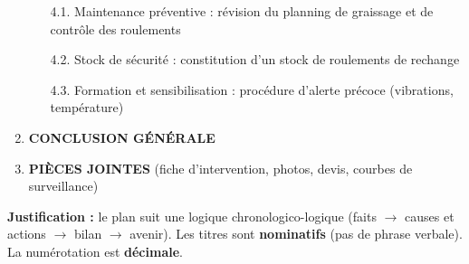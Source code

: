 \documentclass[11pt]{article}
\newcommand{\cle}[1]{{\popxbold\color{popdark}#1}}
\begin{document}
\begin{exoresolu}
\begin{enumerate}
              \begin{enumerate}
                  \item[4.1.] Maintenance préventive : révision du planning de graissage et de contrôle des roulements
                  \item[4.2.] Stock de sécurité : constitution d'un stock de roulements de rechange
                  \item[4.3.] Formation et sensibilisation : procédure d'alerte précoce (vibrations, température)
              \end{enumerate}
        \item \textbf{CONCLUSION GÉNÉRALE}
        \item \textbf{PIÈCES JOINTES} (fiche d'intervention, photos, devis, courbes de surveillance)
    \end{enumerate}
    \textbf{Justification :} le plan suit une \cle{logique chronologico-logique} (faits $\rightarrow$ causes et actions $\rightarrow$ bilan $\rightarrow$ avenir). Les titres sont \textbf{nominatifs} (pas de phrase verbale). La numérotation est \textbf{décimale}.
\end{exoresolu}
\end{document}
